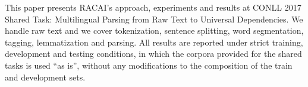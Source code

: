 This paper presents RACAI's approach, experiments and results at CONLL 2017 Shared Task: Multilingual Parsing from Raw Text to Universal Dependencies. We handle raw text and we cover tokenization, sentence splitting, word segmentation, tagging, lemmatization and parsing. All results are reported under strict training, development and testing conditions, in which the corpora provided for the shared tasks is used ``as is'', without any modifications to the composition of the train and development sets.
